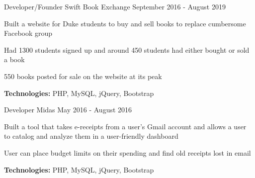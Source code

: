 
\begin{cventries}

  \cventry
    {Developer/Founder} %
    {Swift Book Exchange} %
    {} %
    {September 2016 - August 2019} %
    {
      \begin{cvitems} %
      	\item {Built a website for Duke students to buy and sell books to replace cumbersome Facebook group}
		\item {Had 1300 students signed up and around 450 students had either bought or sold a book}
		\item {550 books posted for sale on the website at its peak}
		{\setlength \itemindent{-2ex} \itemsep2pt \item[] \textbf{Technologies:} PHP, MySQL, jQuery, Bootstrap}
		{\setlength \itemindent{-2ex} \itemsep2pt \item[]  \href{https://sujaygarlanka.com/projects.html\#swift}{ \faPlayCircle \textbf{\color{awesome}{ Demo}}} \href{https://github.com/sujaygarlanka/swift-book-exchange}{ \faGithub \textbf{\color{awesome}{ Code}}}}
      \end{cvitems}
    }
    
 \cventry
    {Developer} %
    {Midas} %
    {} %
    {May 2016 - August 2016} %
    {
      \begin{cvitems} %
		\item {Built a tool that takes e-receipts from a user’s Gmail account and allows a user to catalog and
analyze them in a user-friendly dashboard}
        \item {User can place budget limits on their spending and find old receipts lost in email}
        {\setlength \itemindent{-2ex} \itemsep2pt \item[] \textbf{Technologies:} PHP, MySQL, jQuery, Bootstrap}
        {\setlength \itemindent{-2ex} \itemsep2pt \item[]  \href{https://sujaygarlanka.com/projects.html\#receipt}{ \faPlayCircle \textbf{\color{awesome}{ Demo}}} \href{https://github.com/sujaygarlanka/receipt-database}{ \faGithub \textbf{\color{awesome}{ Code}}}}
      \end{cvitems}
    }
\end{cventries}